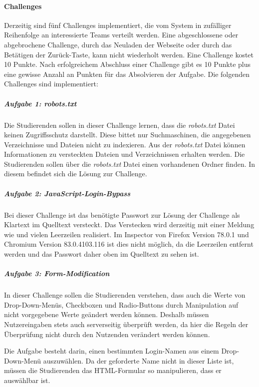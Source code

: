 \paragraph{Challenges} \label{para:Challenges}
Derzeitig sind fünf Challenges implementiert, die vom System in zufälliger Reihenfolge an interessierte Teams verteilt werden. Eine abgeschlossene oder abgebrochene Challenge, durch das Neuladen der Webseite oder durch das Betätigen der Zurück-Taste, kann nicht wiederholt werden. Eine Challenge kostet 10 Punkte. Nach erfolgreichem Abschluss einer Challenge gibt es 10 Punkte plus eine gewisse Anzahl an Punkten für das Absolvieren der Aufgabe. Die folgenden Challenges sind implementiert: \cite[S.19]{abtsUeberarbeitungUndErweiterung2016}

\subparagraph{Aufgabe 1: robots.txt}\label{subpara:Aufgabe_1_robots.txt}
Die Studierenden sollen in dieser Challenge lernen, dass die \textit{robots.txt} Datei keinen Zugriffsschutz darstellt. Diese bittet nur Suchmaschinen, die angegebenen Verzeichnisse und Dateien nicht zu indexieren. Aus der \textit{robots.txt} Datei können Informationen zu versteckten Dateien und Verzeichnissen erhalten werden. Die Studierenden sollen über die \textit{robots.txt} Datei einen vorhandenen Ordner finden. In diesem befindet sich die Lösung zur Challenge. \cite[S.19-20]{abtsUeberarbeitungUndErweiterung2016}

\subparagraph{Aufgabe 2: JavaScript-Login-Bypass}\label{subpara:Aufgabe_2_JavaScript-Login-Bypass}
Bei dieser Challenge ist das benötigte Passwort zur Lösung der Challenge als Klartext im Quelltext versteckt. Das Verstecken wird derzeitig mit einer Meldung wie  und vielen Leerzeilen realisiert. Im Inspector von Firefox Version 78.0.1 und Chromium Version 83.0.4103.116 ist dies nicht möglich, da die Leerzeilen entfernt werden und das Passwort daher oben im Quelltext zu sehen ist. \cite[S.20]{abtsUeberarbeitungUndErweiterung2016}

\subparagraph{Aufgabe 3: Form-Modification}\label{subpara:Aufgabe_3_Form-Modification}
In dieser Challenge sollen die Studierenden verstehen, dass auch die Werte von Drop-Down-Menüs, Checkboxen und Radio-Buttons durch Manipulation auf nicht vorgegebene Werte geändert werden können. Deshalb müssen Nutzereingaben stets auch serverseitig überprüft werden, da hier die Regeln der Überprüfung nicht durch den Nutzenden verändert werden können.

Die Aufgabe besteht darin, einen bestimmten Login-Namen aus einem Drop-Down-Menü auszuwählen. Da der geforderte Name nicht in dieser Liste ist, müssen die Studierenden das HTML-Formular so manipulieren, dass er auswählbar ist. \cite[S.20]{abtsUeberarbeitungUndErweiterung2016}


